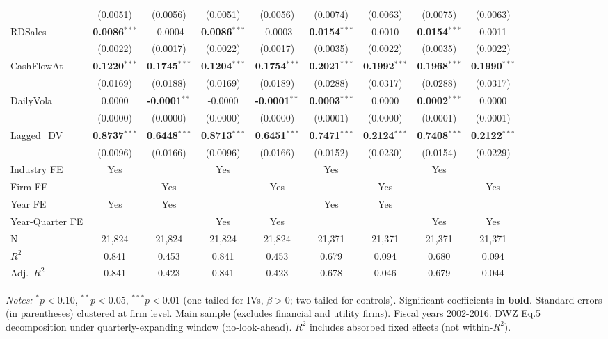 \begin{landscape}
\begin{table}[H]
\begin{tabular}{lcccccccc}
 & (0.0051) & (0.0056) & (0.0051) & (0.0056) & (0.0074) & (0.0063) & (0.0075) & (0.0063) \\
RDSales & \textbf{0.0086}$^{***}$ & -0.0004 & \textbf{0.0086}$^{***}$ & -0.0003 & \textbf{0.0154}$^{***}$ & 0.0010 & \textbf{0.0154}$^{***}$ & 0.0011 \\
 & (0.0022) & (0.0017) & (0.0022) & (0.0017) & (0.0035) & (0.0022) & (0.0035) & (0.0022) \\
CashFlowAt & \textbf{0.1220}$^{***}$ & \textbf{0.1745}$^{***}$ & \textbf{0.1204}$^{***}$ & \textbf{0.1754}$^{***}$ & \textbf{0.2021}$^{***}$ & \textbf{0.1992}$^{***}$ & \textbf{0.1968}$^{***}$ & \textbf{0.1990}$^{***}$ \\
 & (0.0169) & (0.0188) & (0.0169) & (0.0189) & (0.0288) & (0.0317) & (0.0288) & (0.0317) \\
DailyVola & 0.0000 & \textbf{-0.0001}$^{**}$ & -0.0000 & \textbf{-0.0001}$^{**}$ & \textbf{0.0003}$^{***}$ & 0.0000 & \textbf{0.0002}$^{***}$ & 0.0000 \\
 & (0.0000) & (0.0000) & (0.0000) & (0.0000) & (0.0001) & (0.0000) & (0.0001) & (0.0001) \\
Lagged\_DV & \textbf{0.8737}$^{***}$ & \textbf{0.6448}$^{***}$ & \textbf{0.8713}$^{***}$ & \textbf{0.6451}$^{***}$ & \textbf{0.7471}$^{***}$ & \textbf{0.2124}$^{***}$ & \textbf{0.7408}$^{***}$ & \textbf{0.2122}$^{***}$ \\
 & (0.0096) & (0.0166) & (0.0096) & (0.0166) & (0.0152) & (0.0230) & (0.0154) & (0.0229) \\
\midrule
Industry FE & Yes &  & Yes &  & Yes &  & Yes &  \\
Firm FE &  & Yes &  & Yes &  & Yes &  & Yes \\
Year FE & Yes & Yes &  &  & Yes & Yes &  &  \\
Year-Quarter FE &  &  & Yes & Yes &  &  & Yes & Yes \\
\midrule
N & 21,824 & 21,824 & 21,824 & 21,824 & 21,371 & 21,371 & 21,371 & 21,371 \\
$R^2$ & 0.841 & 0.453 & 0.841 & 0.453 & 0.679 & 0.094 & 0.680 & 0.094 \\
Adj.~$R^2$ & 0.841 & 0.423 & 0.841 & 0.423 & 0.678 & 0.046 & 0.679 & 0.044 \\
\bottomrule
\end{tabular}
\begin{minipage}{\linewidth}
\vspace{2pt}\scriptsize
\textit{Notes:} $^{*}p<0.10$, $^{**}p<0.05$, $^{***}p<0.01$ (one-tailed for IVs, $\beta > 0$; two-tailed for controls).
 Significant coefficients in \textbf{bold}.
 Standard errors (in parentheses) clustered at firm level.
 Main sample (excludes financial and utility firms). Fiscal years 2002-2016. DWZ Eq.5 decomposition under quarterly-expanding window (no-look-ahead).
 $R^2$ includes absorbed fixed effects (not within-$R^2$).
\end{minipage}
\end{table}
\end{landscape}
